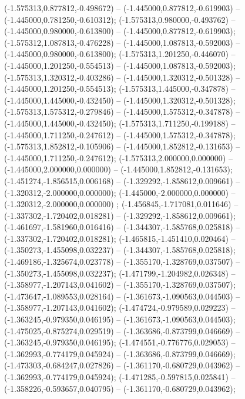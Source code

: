  (-1.575313,0.877812,-0.498672) -- (-1.445000,0.877812,-0.619903) -- (-1.445000,0.781250,-0.610312);
 (-1.575313,0.980000,-0.493762) -- (-1.445000,0.980000,-0.613800) -- (-1.445000,0.877812,-0.619903);
 (-1.575312,1.087813,-0.476228) -- (-1.445000,1.087813,-0.592003) -- (-1.445000,0.980000,-0.613800);
 (-1.575313,1.201250,-0.446070) -- (-1.445000,1.201250,-0.554513) -- (-1.445000,1.087813,-0.592003);
 (-1.575313,1.320312,-0.403286) -- (-1.445000,1.320312,-0.501328) -- (-1.445000,1.201250,-0.554513);
 (-1.575313,1.445000,-0.347878) -- (-1.445000,1.445000,-0.432450) -- (-1.445000,1.320312,-0.501328);
 (-1.575313,1.575312,-0.279846) -- (-1.445000,1.575312,-0.347878) -- (-1.445000,1.445000,-0.432450);
 (-1.575313,1.711250,-0.199188) -- (-1.445000,1.711250,-0.247612) -- (-1.445000,1.575312,-0.347878);
 (-1.575313,1.852812,-0.105906) -- (-1.445000,1.852812,-0.131653) -- (-1.445000,1.711250,-0.247612);
 (-1.575313,2.000000,0.000000) -- (-1.445000,2.000000,0.000000) -- (-1.445000,1.852812,-0.131653);
 (-1.451274,-1.856515,0.006168) -- (-1.329292,-1.858612,0.009661) -- (-1.320312,-2.000000,0.000000);
 (-1.445000,-2.000000,0.000000) -- (-1.320312,-2.000000,0.000000) ;
 (-1.456845,-1.717081,0.011646) -- (-1.337302,-1.720402,0.018281) -- (-1.329292,-1.858612,0.009661);
 (-1.461697,-1.581960,0.016416) -- (-1.344307,-1.585768,0.025818) -- (-1.337302,-1.720402,0.018281);
 (-1.465815,-1.451410,0.020464) -- (-1.350273,-1.455098,0.032237) -- (-1.344307,-1.585768,0.025818);
 (-1.469186,-1.325674,0.023778) -- (-1.355170,-1.328769,0.037507) -- (-1.350273,-1.455098,0.032237);
 (-1.471799,-1.204982,0.026348) -- (-1.358977,-1.207143,0.041602) -- (-1.355170,-1.328769,0.037507);
 (-1.473647,-1.089553,0.028164) -- (-1.361673,-1.090563,0.044503) -- (-1.358977,-1.207143,0.041602);
 (-1.474724,-0.979589,0.029223) -- (-1.363245,-0.979350,0.046195) -- (-1.361673,-1.090563,0.044503);
 (-1.475025,-0.875274,0.029519) -- (-1.363686,-0.873799,0.046669) -- (-1.363245,-0.979350,0.046195);
 (-1.474551,-0.776776,0.029053) -- (-1.362993,-0.774179,0.045924) -- (-1.363686,-0.873799,0.046669);
 (-1.473303,-0.684247,0.027826) -- (-1.361170,-0.680729,0.043962) -- (-1.362993,-0.774179,0.045924);
 (-1.471285,-0.597815,0.025841) -- (-1.358226,-0.593657,0.040795) -- (-1.361170,-0.680729,0.043962);
